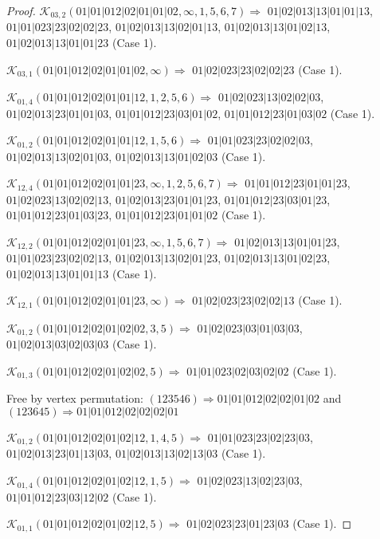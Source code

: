 \documentclass[12pt]{article}
\theoremstyle{plain}
\theoremstyle{definition}
\theoremstyle{remark}
\newcommand{\fancy}[1]{\mathcal{#1}}
\def\K{\fancy{K}}
\begin{document}
\begin{proof}
	$\K_{03,2}(01|01|012|02|01|01|02,\infty,1, 5, 6, 7)\Rightarrow $ $01|02|013|13|01|01|13$, $01|01|023|23|02|02|23$, $01|02|013|13|02|01|13$, $01|02|013|13|01|02|13$, $01|02|013|13|01|01|23$ (Case 1).
	
	$\K_{03,1}(01|01|012|02|01|01|02,\infty)\Rightarrow $ $01|02|023|23|02|02|23$ (Case 1).
	
	
	\bigskip
	
	$\K_{01,4}(01|01|012|02|01|01|12,1, 2, 5, 6)\Rightarrow $ $01|02|023|13|02|02|03$, $01|02|013|23|01|01|03$, $01|01|012|23|03|01|02$, $01|01|012|23|01|03|02$ (Case 1).
	
	$\K_{01,2}(01|01|012|02|01|01|12,1, 5, 6)\Rightarrow $ $01|01|023|23|02|02|03$, $01|02|013|13|02|01|03$, $01|02|013|13|01|02|03$ (Case 1).
	
	
	\bigskip
	
	$\K_{12,4}(01|01|012|02|01|01|23,\infty,1, 2, 5, 6, 7)\Rightarrow $ $01|01|012|23|01|01|23$, $01|02|023|13|02|02|13$, $01|02|013|23|01|01|23$, $01|01|012|23|03|01|23$, $01|01|012|23|01|03|23$, $01|01|012|23|01|01|02$ (Case 1).
	
	$\K_{12,2}(01|01|012|02|01|01|23,\infty,1, 5, 6, 7)\Rightarrow $ $01|02|013|13|01|01|23$, $01|01|023|23|02|02|13$, $01|02|013|13|02|01|23$, $01|02|013|13|01|02|23$, $01|02|013|13|01|01|13$ (Case 1).
	
	$\K_{12,1}(01|01|012|02|01|01|23,\infty)\Rightarrow $ $01|02|023|23|02|02|13$ (Case 1).
	
	
	\bigskip
	
	$\K_{01,2}(01|01|012|02|01|02|02,3, 5)\Rightarrow $ $01|02|023|03|01|03|03$, $01|02|013|03|02|03|03$ (Case 1).
	
	$\K_{01,3}(01|01|012|02|01|02|02,5)\Rightarrow $ $01|01|023|02|03|02|02$ (Case 1).
	
	
	
	Free by vertex permutation: $(1 2 3 5 4 6)\Rightarrow 01|01|012|02|02|01|02$ and $(1 2 3 6 4 5)\Rightarrow 01|01|012|02|02|02|01$
	
	
	
	\bigskip
	
	$\K_{01,2}(01|01|012|02|01|02|12,1, 4, 5)\Rightarrow $ $01|01|023|23|02|23|03$, $01|02|013|23|01|13|03$, $01|02|013|13|02|13|03$ (Case 1).
	
	$\K_{01,4}(01|01|012|02|01|02|12,1, 5)\Rightarrow $ $01|02|023|13|02|23|03$, $01|01|012|23|03|12|02$ (Case 1).
	
	$\K_{01,1}(01|01|012|02|01|02|12,5)\Rightarrow $ $01|02|023|23|01|23|03$ (Case 1).
	

\end{proof}
\end{document}
